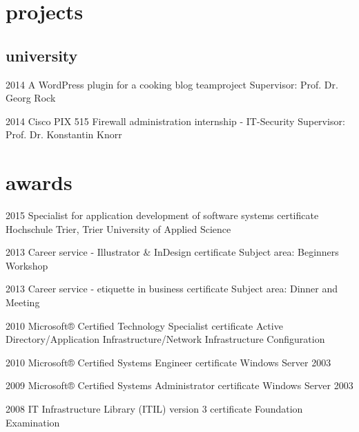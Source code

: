 \documentclass[]{friggeri-cv} %
\begin{document}
\newpage
\section{projects}
\subsection{university}

\begin{entrylist}


\entry
{2014}
{A WordPress plugin for a cooking blog}
{teamproject}
{Supervisor: Prof. Dr. Georg Rock}


\entry
{2014}
{Cisco PIX 515 Firewall administration}
{internship - IT-Security}
{Supervisor: Prof. Dr. Konstantin Knorr}


\end{entrylist}


\section{awards}
\begin{entrylist}

\entry
{2015}
{Specialist for application development of software systems}
{certificate}
{Hochschule Trier, Trier University of Applied Science}

\entry
{2013}
{Career service - Illustrator \& InDesign}
{certificate}
{Subject area: Beginners Workshop}

\entry
{2013}
{Career service - etiquette in business}
{certificate}
{Subject area: Dinner and Meeting}

\entry
{2010}
{Microsoft® Certified Technology Specialist}
{certificate}
{Active Directory/Application Infrastructure/Network Infrastructure Configuration}

\entry
{2010}
{Microsoft® Certified Systems Engineer}
{certificate}
{Windows Server 2003}

\entry
{2009}
{Microsoft® Certified Systems Administrator}
{certificate}
{Windows Server 2003}

\entry
{2008}
{IT Infrastructure Library (ITIL) version 3}
{certificate}
{Foundation Examination}


\end{entrylist}
\end{document}
